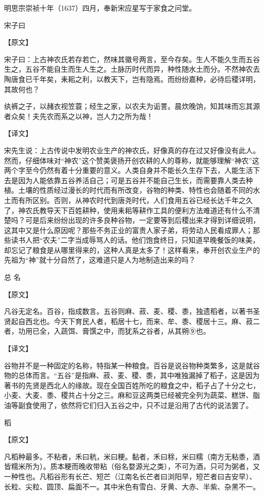 \documentclass[12pt,UTF8]{ctexbook}
\begin{document}
明思宗崇祯十年（1637）四月，奉新宋应星写于家食之问堂。

\mainmatter





宋子曰

【原文】

宋子曰：上古神农氏若存若亡，然味其徽号两言，至今存矣。生人不能久生而五谷生之，五谷不能自生而生人生之。土脉历时代而异，种性随水土而分。不然神农去陶唐食已千年矣，耒耜之利，以教天下，岂有隐焉。而纷纷嘉种，必待后稷详明，其故何也？

纨裤之子，以赭衣视笠蓑；经生之家，以农夫为诟詈。晨炊晚饷，知其味而忘其源者众矣！夫先农而系之以神，岂人力之所为哉！

【译文】

宋先生说：上古传说中发明农业生产的神农氏，好像真的存在过又好像没有此人。然而，仔细体味对“神农”这个赞美褒扬开创农耕的人的尊称，就能够理解“神农”这两个字至今仍然有着十分重要的意义。人类自身并不能长久生存下去，人能生活下去是因为人能依靠五谷养活自己；可是五谷并不能自己生长，而需要靠人类去种植。土壤的性质经过漫长的时代而有所改变，谷物的种类、特性也会随着不同的水土而有所区别。否则，从神农时代到唐尧时代，人们食用五谷已经长达千年之久了，神农氏教导天下百姓耕种，使用耒耜等耕作工具的便利方法难道还有什么不清楚吗？可是后来纷纷出现的许多良种谷物，一定要等到后稷出来才得到详细说明，这其中又是什么原因呢？那些不务正业的富贵人家子弟，将劳动人民看成罪人；那些读书人把“农夫”二字当成辱骂人的话。他们饱食终日，只知道早晚餐饭的味美，却忘记了粮食是从哪里得来的，这种人真是太多了！这样看来，奉开创农业生产的先祖为“神”就十分自然了，这难道只是人为地制造出来的吗？

总 名

【原文】

凡谷无定名。百谷，指成数言。五谷则麻、菽、麦、稷、黍，独遗稻者，以著书圣贤起自西北也。今天下育民人者，稻居十七，而来、牟、黍、稷居十三。麻、菽二者，功用已全，入蔬饵、膏馔之中，而犹系之谷者，从其朔⑨也。

【译文】

谷物并不是一种固定的名称，特指某一种粮食。百谷是说谷物种类繁多，这是就谷物的总体而言。“五谷”是指麻、菽、麦、稷、黍，其中唯独漏掉了稻子，这是因为著书的先贤是西北人的缘故。现在全国百姓所吃的粮食之中，稻子占了十分之七，小麦、大麦、黍、稷共占十分之三。麻和豆这两类已经被完全列为蔬菜、糕饼、脂油等副食使用了，依然将它们归入五谷之中，只不过是沿用了古代的说法罢了。

稻

【原文】

凡稻种最多。不粘者，禾曰秔，米曰粳。黏者，禾曰稌，米曰糯（南方无粘黍，酒皆糯米所为）。质本粳而晚收带粘（俗名婺源光之类），不可为酒，只可为粥者，又一种性也。凡稻谷形有长芒、短芒（江南名长芒者曰浏阳早，短芒者曰吉安早）、长粒、尖粒、圆顶、扁面不一。其中米色有雪白、牙黄、大赤、半紫、杂黑不一。
\end{document}

